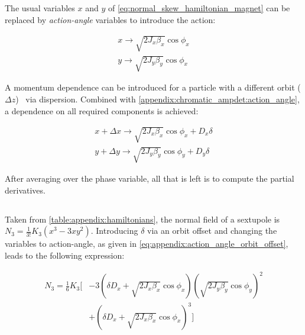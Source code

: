 The usual variables $x$ and $y$ of \cref{eq:normal_skew_hamiltonian_magnet} can be replaced by
\textit{action-angle} variables to introduce the action:

\begin{equation}
  \begin{aligned}
    x \rightarrow \sqrt{2J_x \beta_x} \cos{\phi_x} \\
    y \rightarrow \sqrt{2J_y \beta_y} \cos{\phi_x}
  \end{aligned}
  \label{appendix:chromatic_ampdet:action_angle}
\end{equation}

A momentum dependence can be introduced for a particle with a different orbit
($\Delta z$)~\cite{wiedemann_particle_1999} via dispersion. Combined with
\cref{appendix:chromatic_ampdet:action_angle}, a dependence on all required components is achieved:

\begin{equation}
  \begin{aligned}
    x + \Delta x \rightarrow \sqrt{2J_x \beta_x} \cos{\phi_x} + D_x \delta \\
    y + \Delta y \rightarrow \sqrt{2J_y \beta_y} \cos{\phi_y} + D_y \delta
  \end{aligned}
  \label{eq:appendix:action_angle_orbit_offset}
\end{equation}


After averaging over the phase variable, all that is left is to compute the partial derivatives.



\subsection{}

Taken from \cref{table:appendix:hamiltonians}, the normal field of a sextupole is
$N_3 = \frac{1}{3!} K_3 (x^3 - 3xy^2)$.
Introducing $\delta$ via an orbit offset and changing the variables to action-angle, as given in
\cref{eq:appendix:action_angle_orbit_offset}, leads to the following expression:

\begin{equation}
  \begin{aligned}
    N_3 = \frac{1}{6} K_3 \biggl[
        &- 3\left(\delta D_x + \sqrt{2J_{x} \beta_{x}} \cos{\phi_{x}}\right) \left(\sqrt{2 J_{y} \beta_{y}} \cos \phi_y \right)^2 \\
        &+ \left(\delta D_x + \sqrt{2 J_{x} \beta_{x}} \cos{\phi_{x}}\right)^{3}
    \biggr]
    \end{aligned}
\end{equation}

